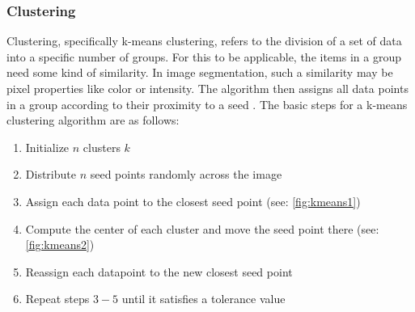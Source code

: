 \subsubsection{Clustering}
Clustering, specifically k-means clustering, refers to the division of a set of data into
a specific number of groups.
For this to be applicable, the items in a group need some kind of similarity.
In image segmentation, such a similarity may be pixel properties like color or intensity.
The algorithm then assigns all data points in a group according to their proximity to a seed \cite{dhanachandraImageSegmentationUsing2015}.
The basic steps for a k-means clustering algorithm are as follows:
\begin{enumerate}
	\item Initialize $n$ clusters $k$
	\item Distribute $n$ seed points randomly across the image
	\item Assign each data point to the closest seed point (see: \cref{fig:kmeans1})
	\item Compute the center of each cluster and move the seed point there (see: \cref{fig:kmeans2})
	\item Reassign each datapoint to the new closest seed point
	\item Repeat steps $3 - 5$ until it satisfies a tolerance value
\end{enumerate}
